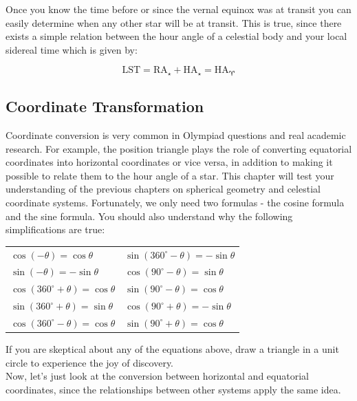 \documentclass[a4paper,12pt]{extarticle}
\begin{document}
Once you know the time before or since the vernal equinox was at transit you can easily determine when any other star will be at transit. This is true, since there exists a simple relation between the hour angle of a celestial body and your local sidereal time which is given by:

\[\boxed{\text{LST}= \text{RA}_\star + \text{HA}_\star=\text{HA}_{\aries}} \]

\subsection*{Coordinate Transformation}

Coordinate conversion is very common in Olympiad questions and real academic research. For example, the position triangle plays the role of converting equatorial coordinates into horizontal coordinates or vice versa, in addition to making it possible to relate them to the hour angle of a star. This chapter will test your understanding of the previous chapters on spherical geometry and celestial coordinate systems. Fortunately, we only need two formulas - the cosine formula and the sine formula. You should also understand why the following
simplifications are true:

\begin{table}[H]
	\centering
	\begin{tabular}{ll}
		$\cos (-\theta) = \cos \theta$ &\quad $\sin (360^\circ - \theta) = -\sin \theta$ \\
		$\sin (-\theta) = -\sin \theta$ &\quad $\cos (90^\circ - \theta) = \sin \theta$ \\
		$\cos (360^\circ + \theta) = \cos \theta$ &\quad $\sin (90^\circ - \theta) = \cos \theta$ \\
		$\sin (360^\circ + \theta) = \sin \theta$ &\quad $\cos (90^\circ + \theta) = -\sin \theta$ \\
		$\cos (360^\circ - \theta) = \cos \theta$ &\quad $\sin (90^\circ + \theta) = \cos \theta$ \\
	\end{tabular}
\end{table}


If you are skeptical about any of the equations above, draw a triangle in a unit circle to experience the joy of discovery. \\

Now, let's just look at the conversion between horizontal and equatorial coordinates, since the relationships between other systems apply the same idea.
\end{document}
